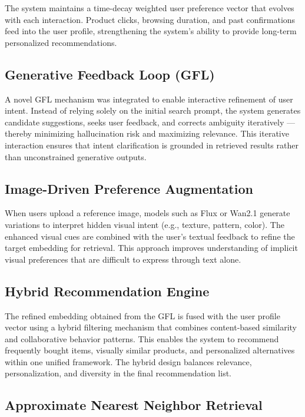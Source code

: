 \documentclass[conference]{IEEEtran}
\begin{document}
The system maintains a time-decay weighted user
preference vector that evolves with each interaction.
Product clicks, browsing duration, and past
confirmations feed into the user profile, strengthening
the system’s ability to provide long-term personalized
recommendations.

\subsection{Generative Feedback Loop (GFL)}

A novel GFL mechanism was integrated to enable interactive refinement of user intent. Instead of relying solely on the initial search prompt, the system generates candidate suggestions, seeks user feedback, and corrects ambiguity iteratively — thereby minimizing hallucination risk and maximizing relevance.
This iterative interaction ensures that intent clarification is grounded in retrieved results rather than unconstrained generative outputs.

\subsection{Image-Driven Preference Augmentation}

When users upload a reference image, models such as Flux or Wan2.1 generate variations to interpret hidden visual intent (e.g., texture, pattern, color). The enhanced visual cues are combined with the user’s textual feedback to refine the target embedding for retrieval.
This approach improves understanding of implicit visual preferences that are difficult to express through text alone.

\subsection{Hybrid Recommendation Engine}

The refined embedding obtained from the GFL is fused with the user profile vector using a hybrid filtering mechanism that combines content-based similarity and collaborative behavior patterns. This enables the system to recommend frequently bought items, visually similar products, and personalized alternatives within one unified framework.
The hybrid design balances relevance, personalization, and diversity in the final recommendation list.

\subsection{Approximate Nearest Neighbor Retrieval}
\end{document}
